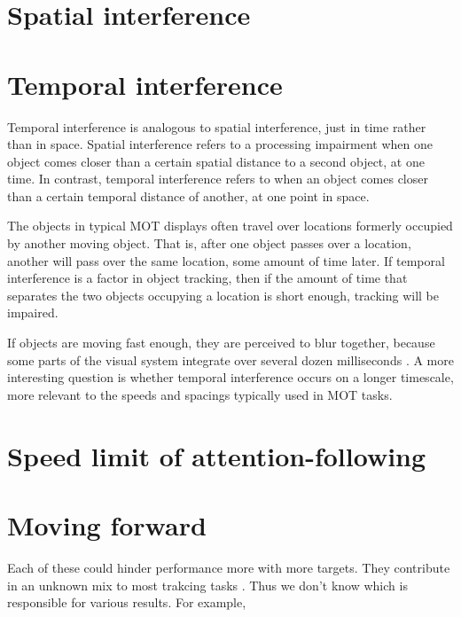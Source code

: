 \documentclass[]{book}
\begin{document}
\hypertarget{spatial-interference}{%
\section{Spatial interference}\label{spatial-interference}}

\hypertarget{temporal-interference}{%
\section{Temporal interference}\label{temporal-interference}}

Temporal interference is analogous to spatial interference, just in time rather than in space. Spatial interference refers to a processing impairment when one object comes closer than a certain spatial distance to a second object, at one time. In contrast, temporal interference refers to when an object comes closer than a certain temporal distance of another, at one point in space.

The objects in typical MOT displays often travel over locations formerly occupied by another moving object. That is, after one object passes over a location, another will pass over the same location, some amount of time later. If temporal interference is a factor in object tracking, then if the amount of time that separates the two objects occupying a location is short enough, tracking will be impaired.

If objects are moving fast enough, they are perceived to blur together, because some parts of the visual system integrate over several dozen milliseconds \citep[e.g.,][]{hogbenPerceptualIntegrationPerceptual1974}. A more interesting question is whether temporal interference occurs on a longer timescale, more relevant to the speeds and spacings typically used in MOT tasks.

\hypertarget{speed-limit-of-attention-following}{%
\section{Speed limit of attention-following}\label{speed-limit-of-attention-following}}

\hypertarget{moving-forward}{%
\section{Moving forward}\label{moving-forward}}

Each of these could hinder performance more with more targets. They contribute in an unknown mix to most trakcing tasks .
Thus we don't know which is responsible for various results. For example,
\end{document}
